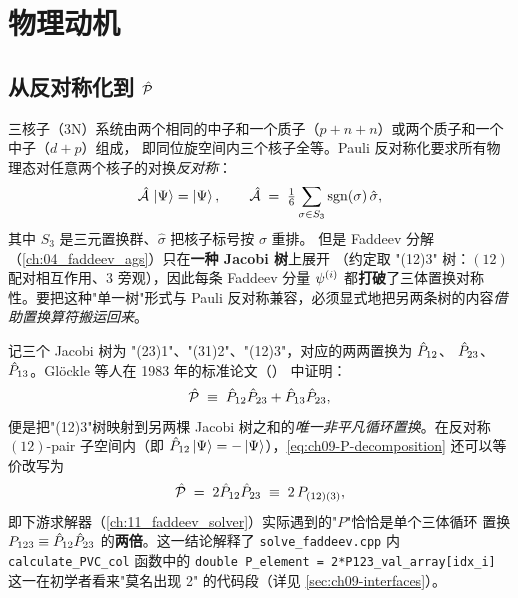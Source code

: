 \section{物理动机}
\label{sec:ch09-motivation}

\subsection{从反对称化到 \texorpdfstring{$\hat{\mathcal{P}}$}{P}}
\label{subsec:ch09-antisymmetrization}

三核子（3N）系统由两个相同的中子和一个质子（\(p+n+n\)）或两个质子和一个中子（\(d+p\)）组成，
即同位旋空间内三个核子全等。Pauli 反对称化要求所有物理态对任意两个核子的对换\emph{反对称}：
\begin{equation}
\label{eq:ch09-antisym}
\hat{\mathcal{A}}\,\ket{\Psi}=\ket{\Psi},\qquad
\hat{\mathcal{A}} \;=\; \tfrac{1}{6}\sum_{\sigma\in S_3}\operatorname{sgn}(\sigma)\,\hat{\sigma},
\end{equation}
其中 \(S_3\) 是三元置换群、\(\hat{\sigma}\) 把核子标号按 \(\sigma\) 重排。
但是 Faddeev 分解（\cref{ch:04_faddeev_ags}）只在\textbf{一种 Jacobi 树}上展开
（约定取 "(12)3" 树：\((12)\) 配对相互作用、\(3\) 旁观），因此每条 Faddeev 分量
\(\psi^{(i)}\) 都\textbf{打破}了三体置换对称性。要把这种"单一树"形式与 Pauli
反对称兼容，必须显式地把另两条树的内容\emph{借助置换算符搬运回来}。

记三个 Jacobi 树为 "(23)1"、"(31)2"、"(12)3"，对应的两两置换为 \(\hat{P}_{12}\)、
\(\hat{P}_{23}\)、\(\hat{P}_{13}\)。Glöckle 等人在 1983 年的标准论文（\cite{Gloeckle1983}）
中证明：
\begin{equation}
\label{eq:ch09-P-decomposition}
\hat{\mathcal{P}} \;\equiv\; \hat{P}_{12}\hat{P}_{23} + \hat{P}_{13}\hat{P}_{23},
\end{equation}
便是把"(12)3"树映射到另两棵 Jacobi 树之和的\emph{唯一非平凡循环置换}。在反对称
\((12)\)-pair 子空间内（即 \(\hat{P}_{12}\ket{\Psi}=-\ket{\Psi}\)），\eqref{eq:ch09-P-decomposition}
还可以等价改写为
\begin{equation}
\label{eq:ch09-P-twoP123}
\hat{\mathcal{P}} \;=\; 2\hat{P}_{12}\hat{P}_{23} \;\equiv\; 2\,P_{(12)(3)},
\end{equation}
即下游求解器（\cref{ch:11_faddeev_solver}）实际遇到的"\(P\)"恰恰是单个三体循环
置换 \(P_{123}\equiv\hat{P}_{12}\hat{P}_{23}\) 的\textbf{两倍}。这一结论解释了
\texttt{solve\_faddeev.cpp} 内 \texttt{calculate\_PVC\_col} 函数中的
\verb|double P_element = 2*P123_val_array[idx_i]| 这一在初学者看来"莫名出现 2"
的代码段（详见 \cref{sec:ch09-interfaces}）。

